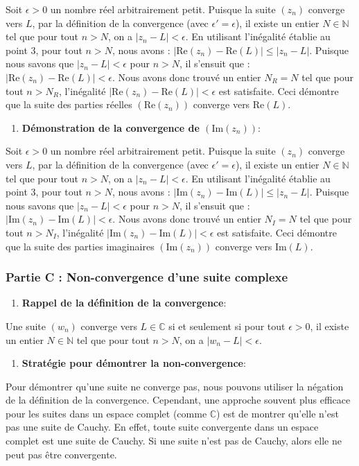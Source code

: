 \documentclass[a4paper,11pt]{report}
\begin{document}
    Soit $\epsilon > 0$ un nombre réel arbitrairement petit.
    Puisque la suite $(z_n)$ converge vers $L$, par la définition de la convergence (avec $\epsilon' = \epsilon$), il existe un entier $N \in \mathbb{N}$ tel que pour tout $n > N$, on a $|z_n - L| < \epsilon$.
    En utilisant l'inégalité établie au point 3, pour tout $n > N$, nous avons :
    $|\text{Re}(z_n) - \text{Re}(L)| \le |z_n - L|$.
    Puisque nous savons que $|z_n - L| < \epsilon$ pour $n > N$, il s'ensuit que :
    $|\text{Re}(z_n) - \text{Re}(L)| < \epsilon$.
    Nous avons donc trouvé un entier $N_R = N$ tel que pour tout $n > N_R$, l'inégalité $|\text{Re}(z_n) - \text{Re}(L)| < \epsilon$ est satisfaite.
    Ceci démontre que la suite des parties réelles $(\text{Re}(z_n))$ converge vers $\text{Re}(L)$.
\begin{enumerate}
\item \textbf{Démonstration de la convergence de $(\text{Im}(z_n))$}:
\end{enumerate}
    Soit $\epsilon > 0$ un nombre réel arbitrairement petit.
    Puisque la suite $(z_n)$ converge vers $L$, par la définition de la convergence (avec $\epsilon' = \epsilon$), il existe un entier $N \in \mathbb{N}$ tel que pour tout $n > N$, on a $|z_n - L| < \epsilon$.
    En utilisant l'inégalité établie au point 3, pour tout $n > N$, nous avons :
    $|\text{Im}(z_n) - \text{Im}(L)| \le |z_n - L|$.
    Puisque nous savons que $|z_n - L| < \epsilon$ pour $n > N$, il s'ensuit que :
    $|\text{Im}(z_n) - \text{Im}(L)| < \epsilon$.
    Nous avons donc trouvé un entier $N_I = N$ tel que pour tout $n > N_I$, l'inégalité $|\text{Im}(z_n) - \text{Im}(L)| < \epsilon$ est satisfaite.
    Ceci démontre que la suite des parties imaginaires $(\text{Im}(z_n))$ converge vers $\text{Im}(L)$.

\subsubsection*{Partie C : Non-convergence d'une suite complexe}
\begin{enumerate}
\item \textbf{Rappel de la définition de la convergence}:
\end{enumerate}
    Une suite $(w_n)$ converge vers $L \in \mathbb{C}$ si et seulement si pour tout $\epsilon > 0$, il existe un entier $N \in \mathbb{N}$ tel que pour tout $n > N$, on a $|w_n - L| < \epsilon$.
\begin{enumerate}
\item \textbf{Stratégie pour démontrer la non-convergence}:
\end{enumerate}
    Pour démontrer qu'une suite ne converge pas, nous pouvons utiliser la négation de la définition de la convergence. Cependant, une approche souvent plus efficace pour les suites dans un espace complet (comme $\mathbb{C}$) est de montrer qu'elle n'est pas une suite de Cauchy. En effet, toute suite convergente dans un espace complet est une suite de Cauchy. Si une suite n'est pas de Cauchy, alors elle ne peut pas être convergente.
\end{document}
